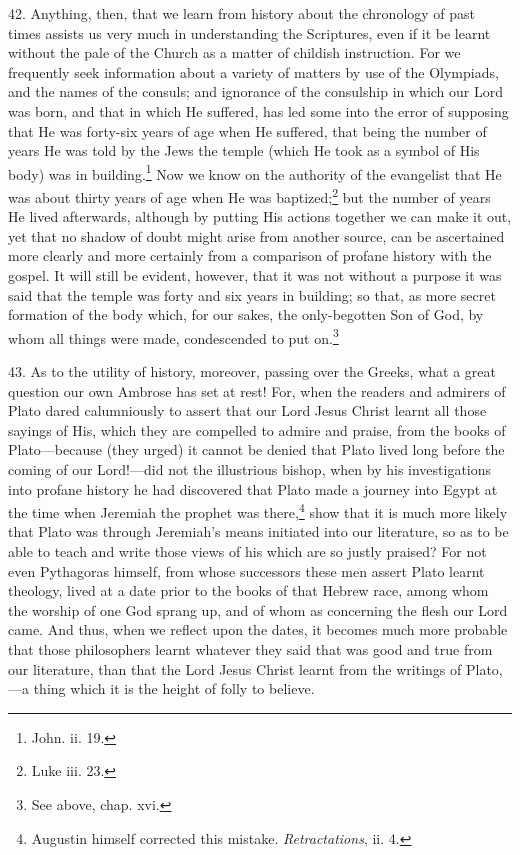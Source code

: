 42. Anything, then, that we learn from history about the chronology of past times assists us very much in understanding the Scriptures, even if it be learnt without the pale of the Church as a matter of childish instruction. For we frequently seek information about a variety of matters by use of the Olympiads, and the names of the consuls; and ignorance of the consulship in which our Lord was born, and that in which He suffered, has led some into the error of supposing that He was forty-six years of age when He suffered, that being the number of years He was told by the Jews the temple (which He took as a symbol of His body) was in building.\footnote{John. ii. 19.} Now we know on the authority of the evangelist that He was about thirty years of age when He was baptized;\footnote{Luke iii. 23.} but the number of years He lived afterwards, although by putting His actions together we can make it out, yet that no shadow of doubt might arise from another source, can be ascertained more clearly and more certainly from a comparison of profane history with the gospel. It will still be evident, however, that it was not without a purpose it was said that the temple was forty and six years in building; so that, as more secret formation of the body which, for our sakes, the only-begotten Son of God, by whom all things were made, condescended to put on.\footnote{See above, chap. xvi.}

43. As to the utility of history, moreover, passing over the Greeks, what a great question our own Ambrose has set at rest! For, when the readers and admirers of Plato dared calumniously to assert that our Lord Jesus Christ learnt all those sayings of His, which they are compelled to admire and praise, from the books of Plato—because (they urged) it cannot be denied that Plato lived long before the coming of our Lord!—did not the illustrious bishop, when by his investigations into profane history he had discovered that Plato made a journey into Egypt at the time when Jeremiah the prophet was there,\footnote{Augustin himself corrected this mistake. \emph{Retractations}, ii. 4.} show that it is much more likely that Plato was through Jeremiah’s means initiated into our literature, so as to be able to teach and write those views of his which are so justly praised? For not even Pythagoras himself, from whose successors these men assert Plato learnt theology, lived at a date prior to the books of that Hebrew race, among whom the worship of one God sprang up, and of whom as concerning the flesh our Lord came. And thus, when we reflect upon the dates, it becomes much more probable that those philosophers learnt whatever they said that was good and true from our literature, than that the Lord Jesus Christ learnt from the writings of Plato,—a thing which it is the height of folly to believe.

